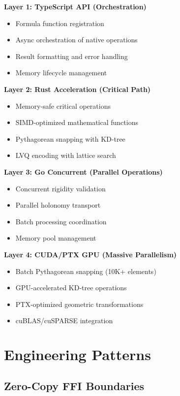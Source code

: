 \documentclass{article}
\begin{document}
\textbf{Layer 1: TypeScript API (Orchestration)}
\begin{itemize}
    \item Formula function registration
    \item Async orchestration of native operations
    \item Result formatting and error handling
    \item Memory lifecycle management
\end{itemize}

\textbf{Layer 2: Rust Acceleration (Critical Path)}
\begin{itemize}
    \item Memory-safe critical operations
    \item SIMD-optimized mathematical functions
    \item Pythagorean snapping with KD-tree
    \item LVQ encoding with lattice search
\end{itemize}

\textbf{Layer 3: Go Concurrent (Parallel Operations)}
\begin{itemize}
    \item Concurrent rigidity validation
    \item Parallel holonomy transport
    \item Batch processing coordination
    \item Memory pool management
\end{itemize}

\textbf{Layer 4: CUDA/PTX GPU (Massive Parallelism)}
\begin{itemize}
    \item Batch Pythagorean snapping (10K+ elements)
    \item GPU-accelerated KD-tree operations
    \item PTX-optimized geometric transformations
    \item cuBLAS/cuSPARSE integration
\end{itemize}

\section{Engineering Patterns}

\subsection{Zero-Copy FFI Boundaries}
\end{document}
